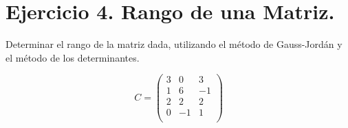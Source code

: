 
\section{\large Ejercicio 4. Rango de una Matriz.}

Determinar el rango de la matriz dada, utilizando el método de Gauss-Jordán y el método de los determinantes.

\[
    C=\left(
        \begin{array}{ccc}
            3 & 0 & 3 \\
            1 & 6 & -1 \\
            2 & 2 & 2 \\
            0 & -1 & 1 \\
        \end{array}
    \right)
\]

